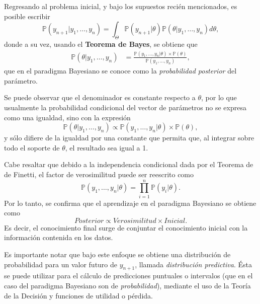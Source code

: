 Regresando al problema inicial, y bajo los supuestos reci\'en mencionados, es posible escribir
\begin{equation*}
    \mathbb{P}(y_{n+1} | y_1,\ldots,y_n) =
    \int_{\Theta} 
    \mathbb{P}(y_{n+1}|\theta) \mathbb{P}(\theta|y_1,\ldots,y_n)d\theta,
\end{equation*}
donde a su vez, usando el \textbf{Teorema de Bayes}, se obtiene que
\begin{equation*}
\begin{aligned}
    \mathbb{P}(\theta|y_1,\ldots,y_n) &=
    \frac{\mathbb{P}(y_1,\ldots,y_n|\theta)\times\mathbb{P}(\theta)}
    {\mathbb{P}(y_1,\ldots,y_n)},
\end{aligned}
\end{equation*}
que en el paradigma Bayesiano se conoce como la \textit{probabilidad posterior} del par\'ametro. 

Se puede observar que el denominador es constante respecto a $\theta$, por lo que usualmente la probabilidad condicional del vector de par\'ametros no se expresa como una igualdad, sino con la expresi\'on
\begin{equation*}
    \mathbb{P}(\theta|y_1,\ldots,y_n) 
    \propto 
    \mathbb{P}(y_1,\ldots,y_n|\theta) \times \mathbb{P}(\theta),
\end{equation*}
y s\'olo difiere de la igualdad por una constante que permita que, al integrar sobre todo el soporte de $\theta$, el resultado sea igual a 1.

Cabe resaltar que debido a la independencia condicional dada por el Teorema de de Finetti, el factor de verosimilitud puede ser reescrito como
\begin{equation*}
    \mathbb{P}(y_1,\ldots,y_n|\theta)  = \prod_{i=1}^n \mathbb{P}(y_i|\theta).
\end{equation*}
Por lo tanto, se confirma que el aprendizaje en el paradigma Bayesiano se obtiene como
\begin{equation*}
    Posterior \propto Verosimilitud \times Inicial.
\end{equation*}
Es decir, el conocimiento final surge de conjuntar el conocimiento inicial con la informaci\'on contenida en los datos.

Es importante notar que bajo este enfoque se obtiene una distribuci\'on de probabilidad para un valor futuro de $y_{n+1}$, llamada \textit{distribuci\'on predictiva}. \'Esta se puede utilizar para el c\'alculo de predicciones puntuales o intervalos (que en el caso del paradigma Bayesiano son de \textit{probabilidad}), mediante el uso de la Teor\'ia de la Decisi\'on y funciones de utilidad o p\'erdida.

